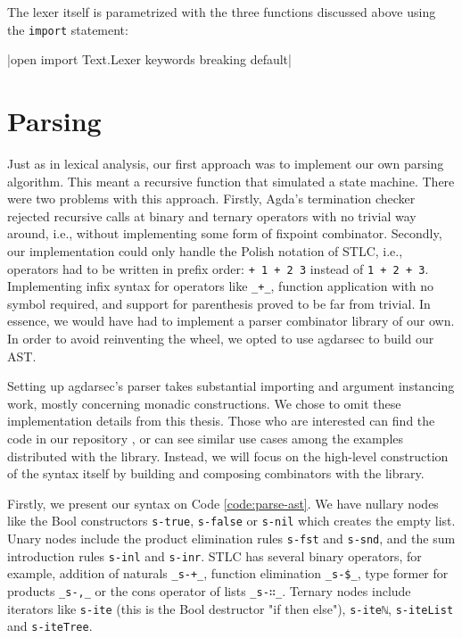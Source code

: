 The lexer itself is parametrized with the three functions discussed above using the \verb$import$ statement:

|open import Text.Lexer keywords breaking default|

\section{Parsing}

Just as in lexical analysis, our first approach was to implement our own parsing algorithm. This meant a recursive function that simulated a state machine. There were two problems with this approach. Firstly, Agda's termination checker rejected recursive calls at binary and ternary operators with no trivial way around, i.e., without implementing some form of fixpoint combinator. Secondly, our implementation could only handle the Polish notation of STLC, i.e., operators had to be written in prefix order: \verb$+ 1 + 2 3$ instead of \verb$1 + 2 + 3$. Implementing infix syntax for operators like \verb$_+_$, function application with no symbol required, and support for parenthesis proved to be far from trivial. In essence, we would have had to implement a parser combinator library of our own. In order to avoid reinventing the wheel, we opted to use agdarsec to build our AST.

Setting up agdarsec's parser takes substantial importing and argument instancing work, mostly concerning monadic constructions. We chose to omit these implementation details from this thesis. Those who are interested can find the code in our repository \cite{home-repo}, or can see similar use cases among the examples distributed with the library. Instead, we will focus on the high-level construction of the syntax itself by building and composing combinators with the library.

Firstly, we present our syntax on Code \ref{code:parse-ast}. We have nullary nodes like the Bool constructors \verb$s-true$, \verb$s-false$ or \verb$s-nil$ which creates the empty list. Unary nodes include the product elimination rules \verb$s-fst$ and \verb$s-snd$, and the sum introduction rules \verb$s-inl$ and \verb$s-inr$. STLC has several binary operators, for example, addition of naturals \verb$_s-+_$, function elimination \verb$_s-$\verb=$=\verb$_$, type former for products \verb$_s-,_$ or the cons operator of lists \verb$_s-∷_$. Ternary nodes include iterators like \verb$s-ite$ (this is the Bool destructor "if then else"), \verb$s-iteℕ$, \verb$s-iteList$ and \verb$s-iteTree$.

